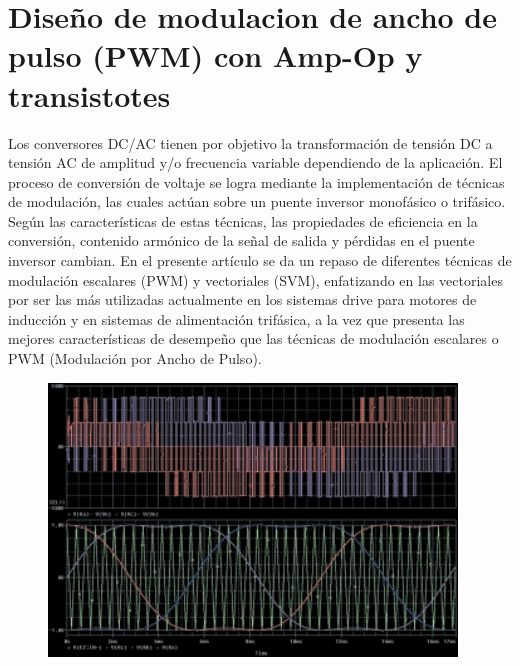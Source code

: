 \documentclass[12pt,a4paper]{article}
\begin{document}
\section{Diseño de modulacion de ancho de pulso (PWM) con Amp-Op y transistotes}
Los conversores DC/AC
tienen por objetivo la transformación de tensión DC a
tensión AC de amplitud y/o
frecuencia variable dependiendo de la aplicación. El
proceso de conversión de
voltaje se logra mediante la
implementación de técnicas
de modulación, las cuales actúan sobre un puente inversor monofásico o trifásico.
Según las características de
estas técnicas, las propiedades de eficiencia en la conversión, contenido armónico
de la señal de salida y pérdidas en el puente inversor
cambian. En el presente
artículo se da un repaso de diferentes técnicas de modulación escalares (PWM) y vectoriales (SVM), enfatizando
en las vectoriales por ser las
más utilizadas actualmente
en los sistemas drive para
motores de inducción y en sistemas de alimentación trifásica, a la vez que presenta
las mejores características de
desempeño que las técnicas
de modulación escalares o
PWM (Modulación por Ancho de Pulso).
\begin{figure}[h!]
\centering
\includegraphics[scale=1]{Captura.PNG} 
\end{figure}
\end{document}
